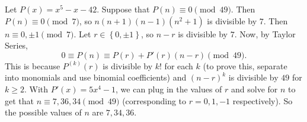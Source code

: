 Let $P\left(x\right)=x^5-x-42$. Suppose that $P\left(n\right)\equiv0\pmod{49}$. Then $P\left(n\right)\equiv0\pmod7$, so $n\left(n+1\right)\left(n-1\right)\left(n^2+1\right)$ is divisible by $7$. Then $n\equiv0,\pm1\pmod7$. Let $r\in\left\{0,\pm1\right\}$, so $n-r$ is divisible by $7$. Now, by Taylor Series, \[0\equiv P\left(n\right)\equiv P\left(r\right)+P'\left(r\right)\left(n-r\right)\pmod{49}.\] This is because $P^{\left(k\right)}\left(r\right)$ is divisible by $k!$ for each $k$ (to prove this, separate into monomials and use binomial coefficients) and $\left(n-r\right)^k$ is divisible by $49$ for $k\geq2$. With $P'\left(x\right)=5x^4-1$, we can plug in the values of $r$ and solve for $n$ to get that $n\equiv7,36,34\pmod{49}$ (corresponding to $r=0,1,-1$ respectively). So the possible values of $n$ are $\boxed{7,34,36}$.